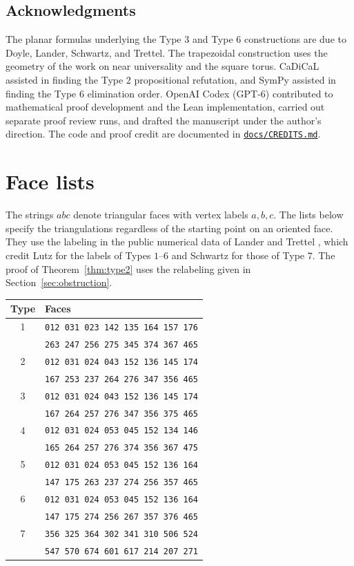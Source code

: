 \documentclass[11pt,letterpaper]{amsart}
\newcommand{\release}{bd3a0e03908481d738df30233cf95c641a1d3f71}
\newcommand{\src}[2]{\href{https://github.com/vltanh/lean4-origami-torus/blob/\release/#1}{\texttt{#2}}}
\begin{document}
\subsection*{Acknowledgments}
The planar formulas underlying the Type \(3\) and Type \(6\)
constructions are due to Doyle, Lander, Schwartz, and Trettel.
The trapezoidal construction uses the geometry of the work on
near universality and the square torus. CaDiCaL assisted in
finding the Type \(2\) propositional refutation, and SymPy
assisted in finding the Type \(6\) elimination order. OpenAI
Codex (GPT-6) contributed to mathematical proof development and
the Lean implementation, carried out separate proof review runs,
and drafted the manuscript under the author's direction. The
code and proof credit are documented in
\src{docs/CREDITS.md}{docs/CREDITS.md}.

\appendix

\section{Face lists}\label{sec:facelists}

The strings \(abc\) denote triangular faces with vertex labels
\(a,b,c\). The lists below specify the triangulations regardless
of the starting point on an oriented face. They use the labeling
in the public numerical data of Lander and Trettel
\cite{data}, which credit Lutz for the labels of Types \(1\)--\(6\)
and Schwartz for those of Type \(7\). The proof of Theorem~\ref{thm:type2} uses the
relabeling given in Section~\ref{sec:obstruction}.

\begin{center}
\small
\begin{tabular}{@{}cl@{}}
\toprule
Type & Faces\\
\midrule
1 & \texttt{012 031 023 142 135 164 157 176}\\
  & \texttt{263 247 256 275 345 374 367 465}\\[2pt]
2 & \texttt{012 031 024 043 152 136 145 174}\\
  & \texttt{167 253 237 264 276 347 356 465}\\[2pt]
3 & \texttt{012 031 024 043 152 136 145 174}\\
  & \texttt{167 264 257 276 347 356 375 465}\\[2pt]
4 & \texttt{012 031 024 053 045 152 134 146}\\
  & \texttt{165 264 257 276 374 356 367 475}\\[2pt]
5 & \texttt{012 031 024 053 045 152 136 164}\\
  & \texttt{147 175 263 237 274 256 357 465}\\[2pt]
6 & \texttt{012 031 024 053 045 152 136 164}\\
  & \texttt{147 175 274 256 267 357 376 465}\\[2pt]
7 & \texttt{356 325 364 302 341 310 506 524}\\
  & \texttt{547 570 674 601 617 214 207 271}\\
\bottomrule
\end{tabular}
\end{center}
\end{document}
